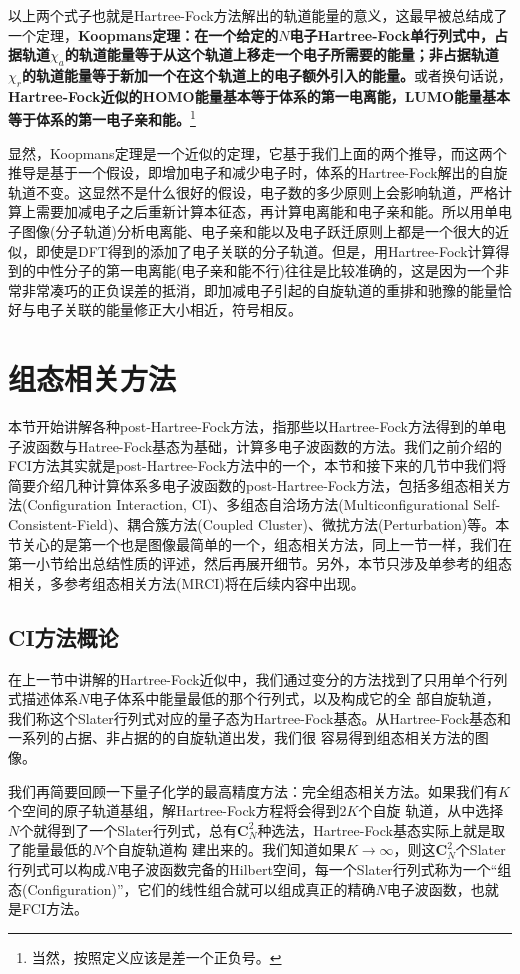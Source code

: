 \documentclass[12pt,a4paper,openany,twoside]{book}
\numberwithin{equation}{section}
\begin{document}
          以上两个式子也就是Hartree-Fock方法解出的轨道能量的意义，这最早被总结成了一个定理，\textbf{Koopmans定理：在一个给定的$N$电子Hartree-Fock单行列式中，占据轨道$\chi_a$的轨道能量等于从这个轨道上移走一个电子所需要的能量；非占据轨道$\chi_r$的轨道能量等于新加一个在这个轨道上的电子额外引入的能量。}或者换句话说，\textbf{Hartree-Fock近似的HOMO能量基本等于体系的第一电离能，LUMO能量基本等于体系的第一电子亲和能。}\footnote{当然，按照定义应该是差一个正负号。}

          显然，Koopmans定理是一个近似的定理，它基于我们上面的两个推导，而这两个推导是基于一个假设，即增加电子和减少电子时，体系的Hartree-Fock解出的自旋轨道不变。这显然不是什么很好的假设，电子数的多少原则上会影响轨道，严格计算上需要加减电子之后重新计算本征态，再计算电离能和电子亲和能。所以用单电子图像(分子轨道)分析电离能、电子亲和能以及电子跃迁原则上都是一个很大的近似，即使是DFT得到的添加了电子关联的分子轨道。但是，用Hartree-Fock计算得到的中性分子的第一电离能(电子亲和能不行)往往是比较准确的，这是因为一个非常非常凑巧的正负误差的抵消，即加减电子引起的自旋轨道的重排和驰豫的能量恰好与电子关联的能量修正大小相近，符号相反。
      \section{组态相关方法}
        本节开始讲解各种post-Hartree-Fock方法，指那些以Hartree-Fock方法得到的单电子波函数与Hatree-Fock基态为基础，计算多电子波函数的方法。我们之前介绍的FCI方法其实就是post-Hartree-Fock方法中的一个，本节和接下来的几节中我们将简要介绍几种计算体系多电子波函数的post-Hartree-Fock方法，包括多组态相关方法(Configuration Interaction, CI)、多组态自洽场方法(Multiconfigurational Self-Consistent-Field)、耦合簇方法(Coupled Cluster)、微扰方法(Perturbation)等。本节关心的是第一个也是图像最简单的一个，组态相关方法，同上一节一样，我们在第一小节给出总结性质的评述，然后再展开细节。另外，本节只涉及单参考的组态相关，多参考组态相关方法(MRCI)将在后续内容中出现。
        
        \subsection{CI方法概论}
          在上一节中讲解的Hartree-Fock近似中，我们通过变分的方法找到了只用单个行列式描述体系$N$电子体系中能量最低的那个行列式，以及构成它的全 部自旋轨道，我们称这个Slater行列式对应的量子态为Hartree-Fock基态。从Hartree-Fock基态和一系列的占据、非占据的的自旋轨道出发，我们很 容易得到组态相关方法的图像。

          我们再简要回顾一下量子化学的最高精度方法：完全组态相关方法。如果我们有$K$个空间的原子轨道基组，解Hartree-Fock方程将会得到$2K$个自旋 轨道，从中选择$N$个就得到了一个Slater行列式，总有$\mathbf{C}_N^2$种选法，Hartree-Fock基态实际上就是取了能量最低的$N$个自旋轨道构 建出来的。我们知道如果$K\rightarrow\infty$，则这$\mathbf{C}_N^2$个Slater行列式可以构成$N$电子波函数完备的Hilbert空间，每一个Slater行列式称为一个“组态(Configuration)”，它们的线性组合就可以组成真正的精确$N$电子波函数，也就是FCI方法。
\end{document}
